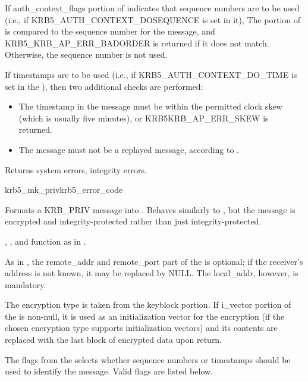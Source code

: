 If auth_context_flags portion of  indicates
that sequence numbers are to be used (i.e., if KRB5_AUTH_CONTEXT_DOSEQUENCE is
set in it), The  portion of
 is compared to the sequence number for the
message, and KRB5_KRB_AP_ERR_BADORDER is returned if it does not match.
Otherwise, the sequence number is not used.


If timestamps are to be used (i.e., if KRB5_AUTH_CONTEXT_DO_TIME is set
in the ), then two additional checks are performed:
\begin{itemize}
\item The timestamp in the message must be within the permitted clock
        skew (which is usually five minutes), or KRB5KRB_AP_ERR_SKEW
        is returned.
\item The message must not be a replayed message, according to
        .
\end{itemize}

Returns system errors, integrity errors.

\begin{funcdecl}{krb5_mk_priv}{krb5_error_code}{\funcinout}
\funcin
{}
\funcout
{}
\end{funcdecl}

Formats a KRB_PRIV message into .  Behaves similarly
to , but the message is encrypted and
integrity-protected rather than just integrity-protected.

, , 
 and
 function as in .

As in , the remote_addr and remote_port part of
the  is optional; if the receiver's address is
not known, it may be replaced by NULL.  The local_addr, however, is
mandatory.

The encryption type is taken from the  keyblock
portion. If i_vector portion of the 
is non-null, it is used as an initialization vector for the encryption
(if the chosen encryption type supports initialization vectors)
and its contents are replaced with the last block of encrypted data
upon return.

The flags from the  selects whether sequence numbers or timestamps
should be used to identify the message.  Valid flags are listed below.

